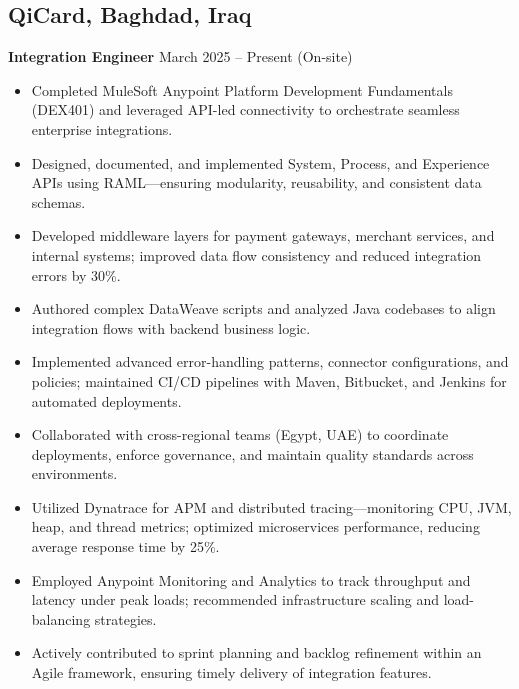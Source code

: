 \documentclass[11pt]{article}
\begin{document}
\subsection*{QiCard, Baghdad, Iraq}
\textbf{Integration Engineer} \hfill March 2025 -- Present (On-site)\\
\begin{itemize}\itemsep0pt
  \item Completed MuleSoft Anypoint Platform Development Fundamentals (DEX401) and leveraged API-led connectivity to orchestrate seamless enterprise integrations.
  \item Designed, documented, and implemented System, Process, and Experience APIs using RAML—ensuring modularity, reusability, and consistent data schemas.
  \item Developed middleware layers for payment gateways, merchant services, and internal systems; improved data flow consistency and reduced integration errors by 30\%.
  \item Authored complex DataWeave scripts and analyzed Java codebases to align integration flows with backend business logic.
  \item Implemented advanced error-handling patterns, connector configurations, and policies; maintained CI/CD pipelines with Maven, Bitbucket, and Jenkins for automated deployments.
  \item Collaborated with cross-regional teams (Egypt, UAE) to coordinate deployments, enforce governance, and maintain quality standards across environments.
  \item Utilized Dynatrace for APM and distributed tracing—monitoring CPU, JVM, heap, and thread metrics; optimized microservices performance, reducing average response time by 25\%.
  \item Employed Anypoint Monitoring and Analytics to track throughput and latency under peak loads; recommended infrastructure scaling and load-balancing strategies.
  \item Actively contributed to sprint planning and backlog refinement within an Agile framework, ensuring timely delivery of integration features.
\end{itemize}
\end{document}
